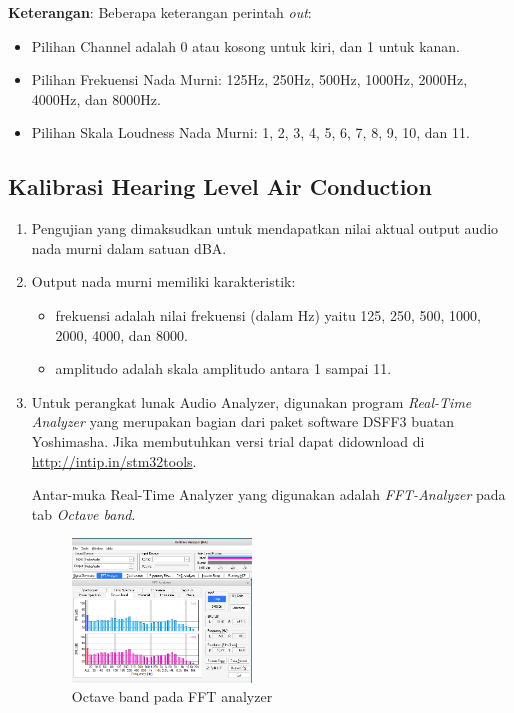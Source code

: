 \documentclass{article}
\begin{document}
	\textbf{Keterangan}: Beberapa keterangan perintah \textit{out}:
	\begin{itemize}
		\item Pilihan Channel adalah 0 atau kosong untuk kiri, dan 1 untuk kanan.
		\item Pilihan Frekuensi Nada Murni: 125Hz, 250Hz, 500Hz, 1000Hz, 2000Hz, 4000Hz, dan 8000Hz.
		\item Pilihan Skala Loudness Nada Murni: 1, 2, 3, 4, 5, 6, 7, 8, 9, 10, dan 11.
	\end{itemize}
	
	\subsection{Kalibrasi Hearing Level Air Conduction}

	\begin{enumerate}
		\item Pengujian yang dimaksudkan untuk mendapatkan nilai aktual output audio nada murni dalam satuan dBA.
		
		\item Output nada murni memiliki karakteristik:
		\begin{itemize}
			\item frekuensi adalah nilai frekuensi (dalam Hz) yaitu 125, 250, 500, 1000, 2000, 4000, dan 8000.
			\item amplitudo adalah skala amplitudo antara 1 sampai 11.
		\end{itemize}
	
		\item Untuk perangkat lunak Audio Analyzer, digunakan program \textit{Real-Time Analyzer}
		yang merupakan bagian dari paket software DSFF3 buatan Yoshimasha.
		Jika membutuhkan versi trial dapat didownload di \url{http://intip.in/stm32tools}.
	
		Antar-muka Real-Time Analyzer yang digunakan adalah \textit{FFT-Analyzer} pada tab \textit{Octave band}.
	
		\begin{figure}[!ht]
			\centering
			\includegraphics[width=0.45\textwidth]{images/rta_fft}
			\caption{Octave band pada FFT analyzer}
		\end{figure}
	

\end{enumerate}
\end{document}
